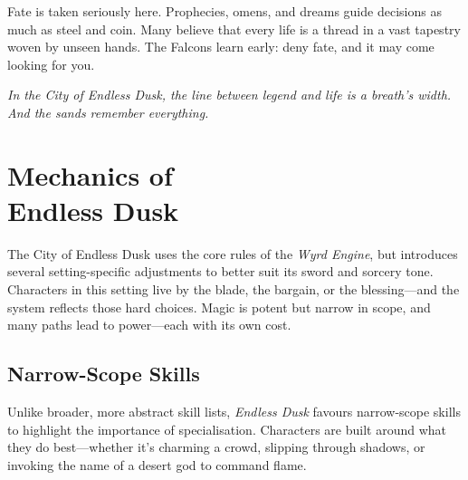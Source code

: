 Fate is taken seriously here. Prophecies, omens, and dreams guide decisions as much as steel and coin. Many believe that every life is a thread in a vast tapestry woven by unseen hands. The Falcons learn early: deny fate, and it may come looking for you.

\textit{In the City of Endless Dusk, the line between legend and life is a breath’s width. And the sands remember everything.}

\section[Mechanics of Endless Dusk]{Mechanics of\\ Endless Dusk}

The City of Endless Dusk uses the core rules of the \textit{Wyrd Engine}, but introduces several setting-specific adjustments to better suit its sword and sorcery tone. Characters in this setting live by the blade, the bargain, or the blessing—and the system reflects those hard choices. Magic is potent but narrow in scope, and many paths lead to power—each with its own cost.

\subsection{Narrow-Scope Skills}

Unlike broader, more abstract skill lists, \textit{Endless Dusk} favours narrow-scope skills to highlight the importance of specialisation. Characters are built around what they do best—whether it’s charming a crowd, slipping through shadows, or invoking the name of a desert god to command flame.

